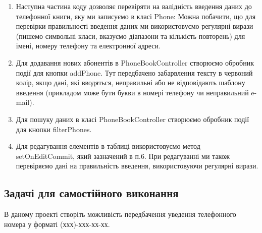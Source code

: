 \begin{enumerate}
		\item Наступна частина коду дозволяє перевіряти на валідність введення даних до телефонної книги, яку ми записуємо в класі Phone:
		Можна побачити, що для перевірки правильності введення даних ми використовуємо регулярні вирази (пишемо символьні класи, вказуємо діапазони та кількість повторень) для імені, номеру телефону та електронної адреси.
		\item Для додавання нових абонентів в PhoneBookController створюємо обробник події для кнопки addPhone.
		Тут передбачено забарвлення тексту в червоний колір, якщо дані, які вводяться, неправильні або не відповідають шаблону введення (прикладом може бути букви в номері телефону чи неправильний e-mail).
		\item Для пошуку даних в класі PhoneBookController створюємо обробник події для кнопки filterPhones.
		\item Для редагування елементів в таблиці використовуємо метод setOnEditCommit, який зазначений в п.6. При редагуванні ми також перевіряємо дані на правильність введення, використовуючи регулярні вирази.
		
	\end{enumerate}
	
	\subsection{Задачі для самостійного виконання}
	В даному проекті створіть можливість передбачення уведення телефонного номера у форматі (ххх)-ххх-хх-хх.